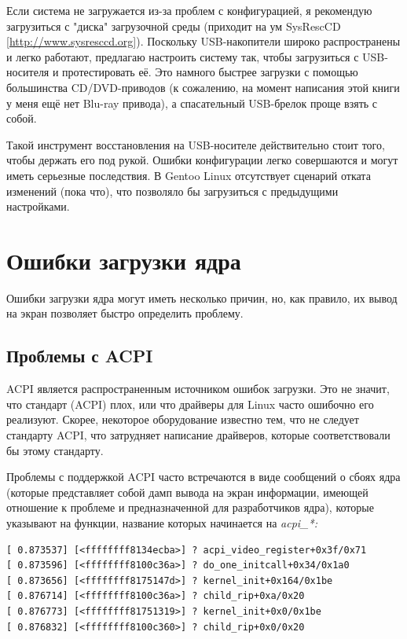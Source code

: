 \documentclass[10pt]{book}
\begin{document}
Если система не загружается из-за проблем с конфигурацией, я рекомендую загрузиться с "диска" загрузочной среды (приходит на ум SysRescCD [\url{http://www.sysresccd.org}]). Поскольку USB-накопители широко распространены и легко работают, предлагаю настроить систему так, чтобы загрузиться с USB-носителя и протестировать её. Это намного быстрее загрузки с помощью большинства CD/DVD-приводов (к сожалению, на момент написания этой книги у меня ещё нет Blu-ray привода), а спасательный USB-брелок проще взять с собой.

Такой инструмент восстановления на USB-носителе  действительно стоит того, чтобы держать его под рукой. Ошибки конфигурации легко совершаются и могут иметь серьезные последствия. В Gentoo Linux отсутствует сценарий отката изменений (пока что), что позволяло бы загрузиться с предыдущими настройками. 

\section{Ошибки загрузки ядра}

Ошибки загрузки ядра могут иметь несколько причин, но, как правило, их вывод на экран позволяет быстро определить проблему.

\subsection{Проблемы с ACPI}

ACPI является распространенным источником ошибок загрузки. Это не значит, что стандарт (ACPI) плох, или что драйверы для Linux часто ошибочно его реализуют. Скорее, некоторое оборудование известно тем, что не следует стандарту ACPI, что затрудняет написание драйверов, которые соответствовали бы этому стандарту. 

Проблемы с поддержкой ACPI часто встречаются в виде сообщений о сбоях ядра (которые представляет собой дамп вывода на экран информации, имеющей отношение к проблеме и предназначенной для разработчиков ядра), которые указывают на функции, название которых  начинается на \textit{acpi\_*:}

\vspace{3mm}
\begin{tcolorbox}
\begin{lstlisting}
[ 0.873537] [<ffffffff8134ecba>] ? acpi_video_register+0x3f/0x71
[ 0.873596] [<ffffffff8100c36a>] ? do_one_initcall+0x34/0x1a0
[ 0.873656] [<ffffffff8175147d>] ? kernel_init+0x164/0x1be
[ 0.876714] [<ffffffff8100c36a>] ? child_rip+0xa/0x20
[ 0.876773] [<ffffffff81751319>] ? kernel_init+0x0/0x1be
[ 0.876832] [<ffffffff8100c360>] ? child_rip+0x0/0x20
\end{lstlisting}
\end{tcolorbox}
\end{document}
